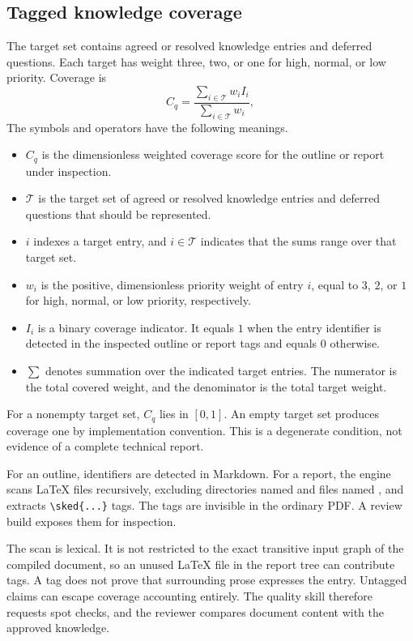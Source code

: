 \documentclass[12pt,a4paper]{article}
\newcommand{\code}[1]{\texttt{\detokenize{#1}}}
\begin{document}
\subsection{Tagged knowledge coverage}
The target set contains agreed or resolved knowledge entries and deferred questions. Each target has weight three, two, or one for high, normal, or low priority. Coverage is
\begin{equation}
 C_q=\frac{\sum_{i\in\mathcal{T}}w_i I_i}{\sum_{i\in\mathcal{T}}w_i},
\end{equation}
The symbols and operators have the following meanings.
\begin{itemize}
\item $C_q$ is the dimensionless weighted coverage score for the outline or report under inspection.
\item $\mathcal{T}$ is the target set of agreed or resolved knowledge entries and deferred questions that should be represented.
\item $i$ indexes a target entry, and $i\in\mathcal{T}$ indicates that the sums range over that target set.
\item $w_i$ is the positive, dimensionless priority weight of entry $i$, equal to $3$, $2$, or $1$ for high, normal, or low priority, respectively.
\item $I_i$ is a binary coverage indicator. It equals $1$ when the entry identifier is detected in the inspected outline or report tags and equals $0$ otherwise.
\item $\sum$ denotes summation over the indicated target entries. The numerator is the total covered weight, and the denominator is the total target weight.
\end{itemize}
For a nonempty target set, $C_q$ lies in $[0,1]$. An empty target set produces coverage one by implementation convention. This is a degenerate condition, not evidence of a complete technical report.

For an outline, identifiers are detected in Markdown. For a report, the engine scans LaTeX files recursively, excluding directories named \code{build} and files named \code{references.tex}, and extracts \verb|\sked{...}| tags. The tags are invisible in the ordinary PDF. A review build exposes them for inspection.

The scan is lexical. It is not restricted to the exact transitive input graph of the compiled document, so an unused LaTeX file in the report tree can contribute tags. A tag does not prove that surrounding prose expresses the entry. Untagged claims can escape coverage accounting entirely. The quality skill therefore requests spot checks, and the reviewer compares document content with the approved knowledge.
\end{document}
